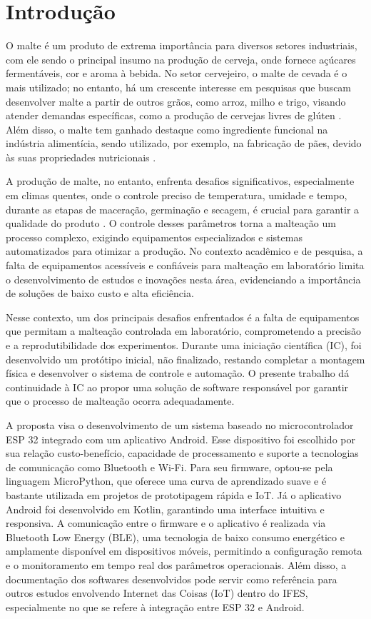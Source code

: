 \chapter[Introdução]{Introdução}

O malte é um produto de extrema importância para diversos setores industriais, com ele sendo o principal insumo na 
produção de cerveja, onde fornece açúcares fermentáveis, cor e aroma à bebida. No setor cervejeiro, o malte de cevada 
é o mais utilizado; no entanto, há um crescente interesse em pesquisas que buscam desenvolver malte a partir de outros 
grãos, como arroz, milho e trigo, visando atender demandas específicas, como a produção de cervejas livres de 
glúten \cite{CECCARONI2019}. Além disso, o malte tem ganhado destaque como ingrediente funcional na indústria 
alimentícia, sendo utilizado, por exemplo, na fabricação de pães, devido às suas propriedades nutricionais \cite{KOISTINEN2020}.

A produção de malte, no entanto, enfrenta desafios significativos, especialmente em climas quentes, onde o controle 
preciso de temperatura, umidade e tempo, durante as etapas de maceração, germinação e secagem, é crucial para garantir 
a qualidade do produto \cite{KOVALOVA2024}. O controle desses parâmetros torna a malteação um processo complexo, 
exigindo equipamentos especializados e sistemas automatizados para otimizar a produção. No contexto acadêmico e de 
pesquisa, a falta de equipamentos acessíveis e confiáveis para malteação em laboratório limita o desenvolvimento de 
estudos e inovações nesta área, evidenciando a importância de soluções de baixo custo e alta eficiência.

Nesse contexto, um dos principais desafios enfrentados é a falta de equipamentos que permitam a malteação controlada em 
laboratório, comprometendo a precisão e a reprodutibilidade dos experimentos. Durante uma iniciação científica (IC), 
foi desenvolvido um protótipo inicial, não finalizado, restando completar a montagem física e desenvolver o sistema 
de controle e automação. O presente trabalho dá continuidade à IC ao propor uma solução de software responsável por 
garantir que o processo de malteação ocorra adequadamente.

A proposta visa o desenvolvimento de um sistema baseado no microcontrolador ESP 32 integrado com um aplicativo Android. 
Esse dispositivo foi escolhido por sua relação custo-benefício, capacidade de processamento e suporte a tecnologias de 
comunicação como Bluetooth e Wi-Fi. Para seu firmware, optou-se pela linguagem MicroPython, que oferece uma curva de 
aprendizado suave e é bastante utilizada em projetos de prototipagem rápida e IoT. Já o aplicativo Android foi 
desenvolvido em Kotlin, garantindo uma interface intuitiva e responsiva. A comunicação entre o firmware e o aplicativo 
é realizada via Bluetooth Low Energy (BLE), uma tecnologia de baixo consumo energético e amplamente disponível em 
dispositivos móveis, permitindo a configuração remota e o monitoramento em tempo real dos parâmetros operacionais. 
Além disso, a documentação dos softwares desenvolvidos pode servir como referência para outros estudos envolvendo 
Internet das Coisas (IoT) dentro do IFES, especialmente no que se refere à integração entre ESP 32 e Android.

